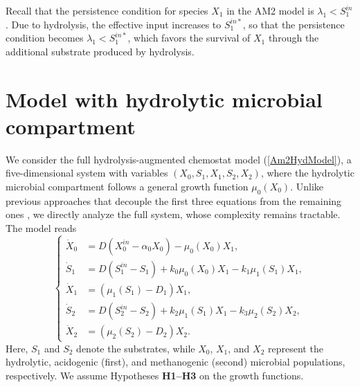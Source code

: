 \documentclass[runningheads]{llncs}
\begin{document}
Recall that the persistence condition for species $X_1$ in the AM2 model is $\lambda_1 < S_1^{in}$ \cite{BenyahiaJPC2012,SariNonLinDyn2021}. 
Due to hydrolysis, the effective input increases to $S_1^{in*}$, so that the persistence condition becomes $\lambda_1 < S_1^{in*}$,
which favors the survival of $X_1$ through the additional substrate produced by hydrolysis.
\section{Model with hydrolytic microbial compartment} \label{SecWithComp}
We consider the full hydrolysis-augmented chemostat model (\ref{Am2HydModel}), a five-dimensional system with variables $(X_0, S_1, X_1, S_2, X_2)$, where the hydrolytic microbial compartment follows a general growth function $\mu_0(X_0)$. 
Unlike previous approaches that decouple the first three equations from the remaining ones \cite{FekihArima2014}, we directly analyze the full system, whose complexity remains tractable. The model reads
\begin{equation}          \label{ModelWithHMC}
\left\{
\begin{aligned}
\dot X_0 &= D(X_0^{in}-\alpha_0 X_0) - \mu_0(X_0) X_1, \\
\dot S_1 &= D(S_1^{in}-S_1) + k_0 \mu_0(X_0) X_1 - k_1 \mu_1(S_1) X_1, \\
\dot X_1 &= (\mu_1(S_1) - D_1) X_1, \\
\dot S_2 &= D(S_2^{in}-S_2) + k_2 \mu_1(S_1) X_1 - k_3 \mu_2(S_2) X_2, \\
\dot X_2 &= (\mu_2(S_2) - D_2) X_2.
\end{aligned}
\right.
\end{equation}
Here, $S_1$ and $S_2$ denote the substrates, while $X_0$, $X_1$, and $X_2$ represent the hydrolytic, acidogenic (first), and methanogenic (second) microbial populations, respectively. We assume Hypotheses {\bf H1--H3} on the growth functions.  
\end{document}
